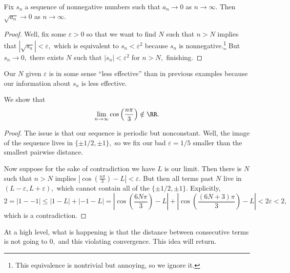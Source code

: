 \begin{exercise}[Ross 8.3]
    Fix $s_n$ a sequence of nonnegative numbers such that $a_n\to0$ as $n\to\infty.$ Then $\sqrt{a_n}\to0$ as $n\to\infty.$
\end{exercise}
\begin{proof}
    Well, fix some $\varepsilon>0$ so that we want to find $N$ such that $n>N$ implies that $|\sqrt{s_n}|<\varepsilon,$ which is equivalent to $s_n<\varepsilon^2$ because $s_n$ is nonnegative.\footnote{This equivalence is nontrivial but annoying, so we ignore it.} But $s_n\to0,$ there exists $N$ such that $|s_n|<\varepsilon^2$ for $n>N,$ finishing.
\end{proof}
\begin{remark}
    Our $N$ given $\varepsilon$ is in some sense ``less effective'' than in previous examples because our information about $s_n$ is less effective.
\end{remark}
\begin{exercise}
    We show that
    \[\lim_{n\to\infty}\cos\left(\frac{n\pi}3\right)\notin\RR.\]
\end{exercise}
\begin{proof}
    The issue is that our sequence is periodic but nonconstant. Well, the image of the sequence lives in $\{\pm1/2,\pm1\},$ so we fix our bad $\varepsilon=1/5$ smaller than the smallest pairwise distance.

    Now suppose for the sake of contradiction we have $L$ is our limit. Then there is $N$ such that $n>N$ implies $\left|\cos\left(\frac{n\pi}3\right)-L\right|<\varepsilon.$ But then all terms past $N$ live in $(L-\varepsilon,L+\varepsilon),$ which cannot contain all of the $\{\pm1/2,\pm1\}.$ Explicitly,
    \[2=|1--1|\le|1-L|+|-1-L|=\left|\cos\left(\frac{6N\pi}3\right)-L\right|+\left|\cos\left(\frac{(6N+3)\pi}3\right)-L\right|<2\varepsilon<2,\]
    which is a contradiction.
\end{proof}
\begin{remark}
    At a high level, what is happening is that the distance between consecutive terms is not going to $0,$ and this violating convergence. This idea will return. 
\end{remark}